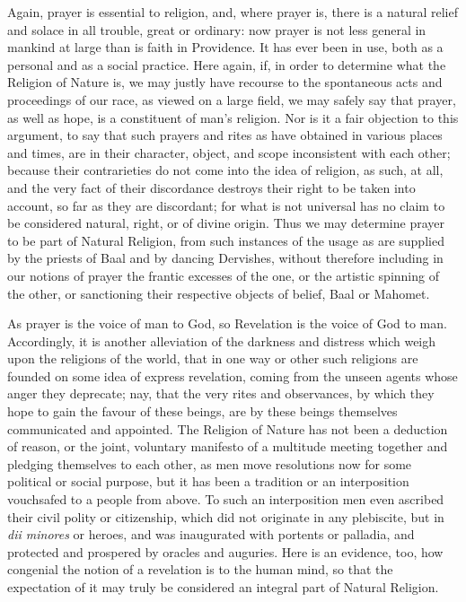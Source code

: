 Again, prayer is essential to religion, and, where prayer is, there
is a natural relief and solace in all trouble, great or ordinary: now
prayer is not less general in mankind at large than is faith in
Providence. It has ever been in use, both as a personal and as a
social practice. Here again, if, in order to determine what the
Religion of Nature is, we may justly have recourse to the spontaneous
acts and proceedings of our race, as viewed on a large field, we may
safely say that prayer, as well as hope, is a constituent of man's
religion. Nor is it a fair objection to this argument, to say that
such prayers and rites as have obtained in various places and times,
are in their character, object, and scope inconsistent with each
other; because their contrarieties do not come into the idea of
religion, as such, at all, and the very fact of their discordance
destroys their right to be taken into account, so far as they
are discordant; for what is not universal has no claim to be
considered natural, right, or of divine origin. Thus we may determine
prayer to be part of Natural Religion, from such instances of the
usage as are supplied by the priests of Baal and by dancing Dervishes,
without therefore including in our notions of prayer the frantic
excesses of the one, or the artistic spinning of the other, or
sanctioning their respective objects of belief, Baal or Mahomet.

As prayer is the voice of man to God, so Revelation is the voice of
God to man. Accordingly, it is another alleviation of the darkness and
distress which weigh upon the religions of the world, that in one way
or other such religions are founded on some idea of express
revelation, coming from the unseen agents whose anger they deprecate;
nay, that the very rites and observances, by which they hope to gain
the favour of these beings, are by these beings themselves
communicated and appointed. The Religion of Nature has not been a
deduction of reason, or the joint, voluntary manifesto of a multitude
meeting together and pledging themselves to each other, as men move
resolutions now for some political or social purpose, but it has been
a tradition or an interposition vouchsafed to a people from above. To
such an interposition men even ascribed their civil polity or
citizenship, which did not originate in any plebiscite, but in \emph{dii
minores} or heroes, and was inaugurated with portents or palladia,
and protected and prospered by oracles and auguries. Here is an
evidence, too, how congenial the notion of a revelation is to the
human mind, so that the expectation of it may truly be
considered an integral part of Natural Religion.

